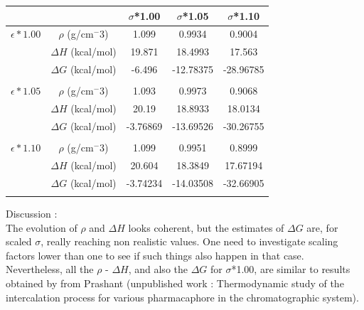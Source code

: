 \documentclass[12pt,a4paper]{article}
\begin{document}
\begin{center}
\begin{tabular}{|c|c|c|c|c|}
\hline  &  & $\sigma$*1.00 & $\sigma$*1.05 & $\sigma$*1.10 \\ 
\hline $\epsilon*1.00$ & $\rho$ (g/cm$^-3$) & 1.099 & 0.9934 & 0.9004 \\ 
\hline  & $\Delta H$ (kcal/mol) & 19.871 & 18.4993 & 17.563 \\ 
\hline  & $\Delta G$ (kcal/mol) & -6.496 & -12.78375 & -28.96785 \\ 
\hline  &  &  &  &  \\ 
\hline $\epsilon*1.05$ & $\rho$ (g/cm$^-3$) & 1.093 & 0.9973 & 0.9068 \\ 
\hline  & $\Delta H$ (kcal/mol) & 20.19 & 18.8933 & 18.0134 \\ 
\hline  & $\Delta G$ (kcal/mol) & -3.76869 & -13.69526 & -30.26755 \\ 
\hline  &  &  &  &  \\ 
\hline $\epsilon*1.10$ & $\rho$ (g/cm$^-3$)& 1.099 & 0.9951 & 0.8999 \\ 
\hline  & $\Delta H$ (kcal/mol) & 20.604 & 18.3849 & 17.67194 \\ 
\hline  & $\Delta G$ (kcal/mol) & -3.74234 & -14.03508 & -32.66905 \\
\hline  &  &  &  &  \\ 
\hline 
\end{tabular} 
\end{center}

Discussion : \\


The evolution of $\rho$ and $\Delta H$ looks coherent, but the estimates of 
$\Delta G$ are, for scaled  $\sigma$, really reaching non realistic values. One need to investigate 
scaling factors lower than one to see if such things also happen in that case.\\



Nevertheless, all the $\rho$ - $\Delta H$, and also the $\Delta G$ for $\sigma$*1.00, are similar 
to results obtained by from Prashant (unpublished work : Thermodynamic study of the intercalation 
process for various
pharmacaphore in the chromatographic system).
\end{document}

